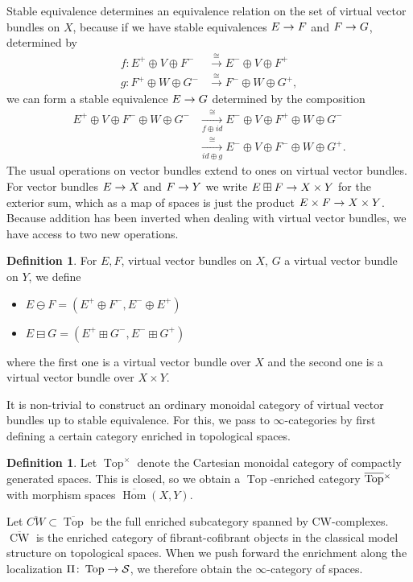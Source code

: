 \documentclass[10pt]{amsart}
\numberwithin{equation}{section}
\theoremstyle{definition}
\newtheorem{definition}[prop]{Definition}
\DeclareMathOperator{\Hom}{Hom}
\DeclareMathOperator{\Top}{Top}
\DeclareMathOperator{\CW}{CW}
\newcommand{\cS}{\mathcal{S}}
\renewcommand{\to}{\mathchoice{\longrightarrow}{\rightarrow}{}{}}
\begin{document}
Stable equivalence determines an equivalence relation on the set of virtual vector bundles on $X$, because if we have stable equivalences $E \to F$ and $F \to G$, determined by
\begin{align*}
	f\colon E^+ \oplus V \oplus F^-  &\xrightarrow{\cong} E^- \oplus V \oplus F^+ \\
	g\colon F^+ \oplus W \oplus G^- &\xrightarrow{\cong} F^- \oplus W \oplus G^+,
\end{align*}
we can form a stable equivalence $E\to G$ determined by the composition
\begin{align*}
	E^+ \oplus V \oplus F^- \oplus W \oplus G^- &\xrightarrow[f\oplus id]{\cong} E^- \oplus V \oplus F^+ \oplus W \oplus G^- \\
	&\xrightarrow[id \oplus g]{\cong} E^- \oplus V \oplus F^- \oplus W \oplus G^+ .
\end{align*}
The usual operations on vector bundles extend to ones on virtual vector bundles. For vector bundles $E\to X$ and $F\to Y$ we write $E\boxplus F \to X\times Y$ for the exterior sum, which as a map of spaces is just the product $E\times F \to X\times Y$. Because addition has been inverted when dealing with virtual vector bundles, we have access to two new operations.
\begin{definition}\label{def:boxplus_boxminus}
	For $E,F$, virtual vector bundles on $X$, $G$ a virtual vector bundle on $Y$, we define
	\begin{itemize}
		\item  $E\ominus F = (E^+ \oplus F^-, E^-\oplus E^+)$
		\item  $E\boxminus G = (E^+ \boxplus G^-, E^- \boxplus G^+)$
	\end{itemize}
	where the first one is a virtual vector bundle over $X$ and the second one is a virtual vector bundle over  $X \times Y$.
\end{definition}
It is non-trivial to construct an ordinary monoidal category of virtual vector bundles up to stable equivalence. For this, we pass to $\infty$-categories by first defining a certain category enriched in topological spaces.
\begin{definition}\label{def:Top}
	Let $\Top^{\times}$ denote the Cartesian monoidal category of compactly generated spaces. This is closed, so we obtain a $\Top$-enriched category $\overline{\Top}\vphantom{p}^{\times}$ with morphism spaces $\overline{\Hom}(X,Y)$.
\end{definition}
Let $\overline{CW}\subset \overline{\Top}$ be the full enriched subcategory spanned by CW-complexes. $\overline{\CW}$ is the enriched category of fibrant-cofibrant objects in the classical model structure on topological spaces. When we push forward the enrichment along the localization $\Pi \colon \Top\to \cS$, we therefore obtain the $\infty$-category of spaces.
\end{document}
